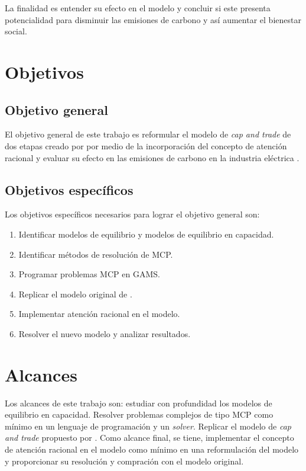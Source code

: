 La finalidad es entender su efecto en el modelo y concluir si este presenta potencialidad para disminuir las emisiones de carbono y así aumentar el bienestar social.


\section{Objetivos}
\subsection{Objetivo general}
El objetivo general de este trabajo es reformular el modelo de \textit{cap and trade} de dos etapas creado por   por medio de la incorporación del concepto de atención racional  y evaluar su efecto en las emisiones de carbono en la industria eléctrica . 

\subsection{Objetivos específicos}
Los objetivos específicos necesarios para lograr el objetivo general son:

\begin{enumerate}
\item Identificar modelos de equilibrio y modelos de equilibrio en capacidad.
\item Identificar métodos de resolución de MCP.
\item Programar problemas MCP en GAMS.
\item Replicar el modelo original de .
\item Implementar atención racional en el modelo.
\item Resolver el nuevo modelo y analizar resultados.
\end{enumerate}


\section{Alcances}

Los alcances de este trabajo son: estudiar con profundidad los modelos de equilibrio en capacidad. Resolver problemas complejos de tipo MCP como mínimo en un lenguaje de programación y un \textit{solver}. Replicar el modelo de \textit{cap and trade} propuesto por . Como alcance final, se tiene, implementar el concepto de atención racional en el modelo como mínimo en una reformulación del modelo y proporcionar su resolución y compración con el modelo original. 
\vspace{2.5mm}

